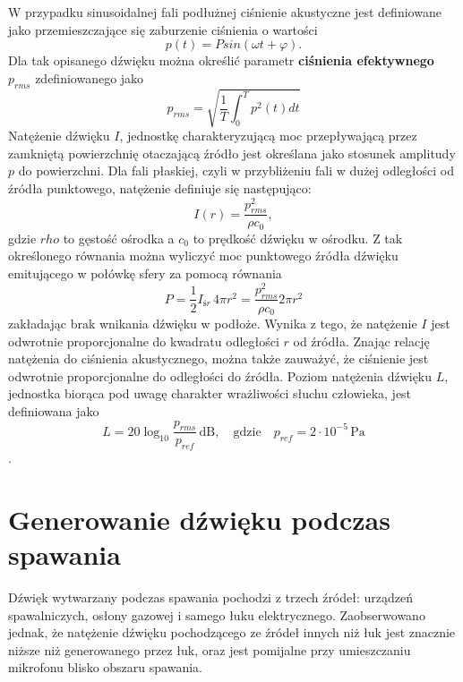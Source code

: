 \documentclass{mwart}
\begin{document}
W przypadku sinusoidalnej fali podłużnej ciśnienie akustyczne jest definiowane jako przemieszczające się zaburzenie ciśnienia o wartości
\begin{equation}
    p(t) = P sin(\omega t + \varphi).
\end{equation}
Dla tak opisanego dźwięku można określić parametr \textbf{ciśnienia efektywnego $p_{rms}$} zdefiniowanego jako
\begin{equation}
p_{rms}=\sqrt{\frac{1}{T}\int_0^T p^2(t)dt}
\end{equation} \cite{crocker_handbook_nodate}
Natężenie dźwięku $I$, jednostkę charakteryzującą moc przepływającą przez zamkniętą powierzchnię otaczającą źródło jest określana jako stosunek amplitudy $p$ do powierzchni. Dla fali płaskiej, czyli w przybliżeniu fali w dużej odległości od źródła punktowego, natężenie definiuje się następująco:
\begin{equation}
    I(r) = \frac{p_{rms}^2}{\rho c_0},
\end{equation} \cite{arata_investigation_1979}
gdzie $rho$ to gęstość ośrodka a $c_0$ to prędkość dźwięku w ośrodku.
Z tak określonego równania można wyliczyć moc punktowego źródła dźwięku emitującego w połówkę sfery za pomocą równania
\begin{equation}
    P = \frac{1}{2}  I_{śr}\, 4 \pi r^2 = \frac{p_{rms}^2}{\rho c_0}2 \pi r^2
\end{equation} \cite{crocker_handbook_nodate}
zakładając brak wnikania dźwięku w podłoże. Wynika z tego, że natężenie $I$ jest odwrotnie proporcjonalne do kwadratu odległości $r$ od źródła.
Znając relację natężenia do ciśnienia akustycznego, można także zauważyć, że ciśnienie jest odwrotnie proporcjonalne do odległości do źródła.
Poziom natężenia dźwięku $L$, jednostka biorąca pod uwagę charakter wrażliwości słuchu człowieka, jest definiowana jako
\begin{equation}
    L = 20\log_{10}\frac{p_{rms}}{p_{ref}}\, \mathrm{dB},\quad  \mathrm{gdzie}\quad p_{ref} = 2\cdot10^{-5} \, \mathrm{Pa}
\end{equation} \cite{crocker_handbook_nodate}.

\section{Generowanie dźwięku podczas spawania}
Dźwięk wytwarzany podczas spawania pochodzi z trzech źródeł: urządzeń spawalniczych, osłony gazowej i samego łuku elektrycznego. Zaobserwowano jednak, że natężenie dźwięku pochodzącego ze źródeł innych niż łuk jest znacznie niższe niż generowanego przez łuk\cite{schiebeck_audible_1991,saini_investigation_1998}, oraz jest pomijalne przy umieszczaniu mikrofonu blisko obszaru spawania\cite{luksa_przydatnosc_2012}.
\end{document}

